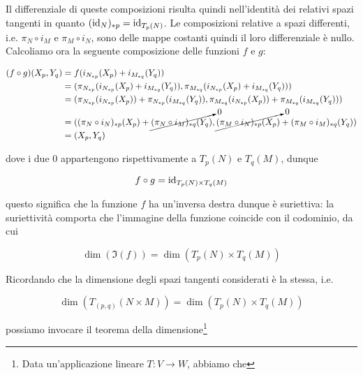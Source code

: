 {Il differenziale di queste composizioni risulta quindi nell'identità dei relativi spazi tangenti in quanto $ (\operatorname{id}_{N})_{*p} = \operatorname{id}_{T_{p}(N)} $. Le composizioni relative a spazi differenti, i.e. $ \pi_{N} \circ i_{M} $ e $ \pi_{M} \circ i_{N} $, sono delle mappe costanti quindi il loro differenziale è nullo. \\
Calcoliamo ora la seguente composizione delle funzioni $ f $ e $ g $:

\begin{align}
	\begin{split}
		(f \circ g) (X_{p}, Y_{q}) &= f ( i_{N_{*p}} (X_{p}) + i_{M_{*q}} (Y_{q}) ) \\
		&= (\pi_{N_{*p}} ( i_{N_{*p}} (X_{p}) + i_{M_{*q}} (Y_{q}) ), \pi_{M_{*q}} ( i_{N_{*p}} (X_{p}) + i_{M_{*q}} (Y_{q}) )) \\
		&= (\pi_{N_{*p}} ( i_{N_{*p}} (X_{p}) ) + \pi_{N_{*p}} ( i_{M_{*q}} (Y_{q}) ), \pi_{M_{*q}} ( i_{N_{*p}} (X_{p})) + \pi_{M_{*q}} ( i_{M_{*q}} (Y_{q}) )) \\
		&= ((\pi_{N} \circ i_{N})_{*p} (X_{p}) + \cancelto{0}{ (\pi_{N} \circ i_{M})_{*q} (Y_{q}) }, \cancelto{0}{ (\pi_{M} \circ i_{N})_{*p} (X_{p}) } + (\pi_{M} \circ i_{M})_{*q} (Y_{q}) ) \\
		&=(X_{p}, Y_{q})
	\end{split}
\end{align}

dove i due $ 0 $ appartengono rispettivamente a $ T_{p}(N) $ e $ T_{q}(M) $, dunque

\begin{equation}
	f \circ g = \operatorname{id}_{T_{p}(N) \times T_{q}(M)}
\end{equation}

questo significa che la funzione $ f $ ha un'inversa destra dunque è suriettiva: la suriettività comporta che l'immagine della funzione coincide con il codominio, da cui

\begin{equation}
	\dim(\Im(f)) = \dim(T_{p}(N) \times T_{q}(M))
\end{equation}

Ricordando che la dimensione degli spazi tangenti considerati è la stessa, i.e.

\begin{equation}
	\dim(T_{(p,q)}(N \times M)) = \dim(T_{p}(N) \times T_{q}(M))
\end{equation}

possiamo invocare il teorema della dimensione\footnote{%
	Data un'applicazione lineare $ T : V \to W $, abbiamo che
	
}}
